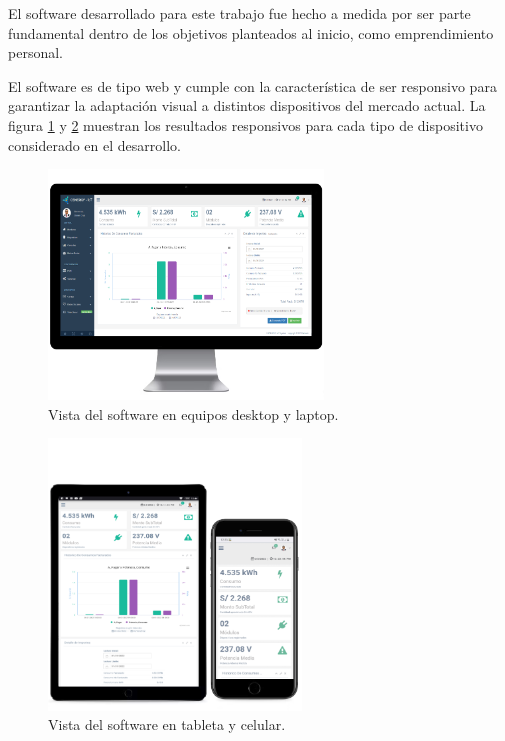 El software desarrollado para este trabajo fue hecho a medida por ser parte fundamental dentro de los objetivos planteados al inicio, como emprendimiento personal. 

El software es de tipo web y cumple con la característica de ser responsivo para garantizar la adaptación visual a distintos dispositivos del mercado actual. La figura \ref{fig:software1} y \ref{fig:software2} muestran los resultados responsivos para cada tipo de dispositivo considerado en el desarrollo.

\begin{figure}[htpb]
\centering 
\includegraphics[width=0.65\textwidth]{./Figures/responsive1.png}
\caption{Vista del software en equipos desktop y laptop.}
\label{fig:software1}
\end{figure}

\begin{figure}[htpb]
\centering 
\includegraphics[width=0.6\textwidth]{./Figures/responsive2.png}
\caption{Vista del software en tableta y celular.}
\label{fig:software2}
\end{figure}
